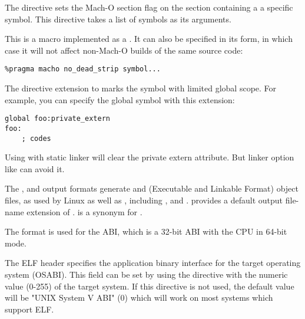 
The directive  sets the Mach-O 
section flag on the section containing a a specific symbol. This directive takes
a list of symbols as its arguments.

This is a macro implemented as a .  It can also be
specified in its  form, in which case it will not affect
non-Mach-O builds of the same source code:

\begin{lstlisting}
%pragma macho no_dead_strip symbol...
\end{lstlisting}


The directive extension to  marks the symbol with limited
global scope. For example, you can specify the global symbol with
this extension:

\begin{lstlisting}
global foo:private_extern
foo:
    ; codes
\end{lstlisting}

Using with static linker will clear the private extern attribute.
But linker option like  can avoid it.


The ,  and  output formats generate
 and  (Executable and Linkable Format) object files,
as used by Linux as well as , including
,  and .
 provides a default output file-name extension of .
 is a synonym for .

The  format is used for the  ABI, which is
a 32-bit ABI with the CPU in 64-bit mode.


The ELF header specifies the application binary interface for the
target operating system (OSABI). This field can be set by using the
 directive with the numeric value (0-255) of the target
system. If this directive is not used, the default value will be "UNIX
System V ABI" (0) which will work on most systems which support ELF.

